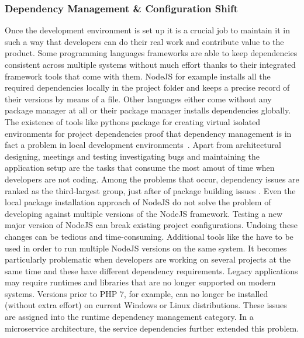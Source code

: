 \documentclass[12pt, a4paper]{article}
\begin{document}
        \subsubsection{Dependency Management \& Configuration Shift}\label{sssec::dependency}
        Once the development environment is set up it is a crucial job to maintain it in such a way that developers can do their real work and contribute value to the product. Some programming languages frameworks are able to keep dependencies consistent across multiple systems without much effort thanks to their integrated framework tools that come with them. NodeJS for example installs all the required dependencies locally in the project folder and keeps a precise record of their versions by means of a  file. Other languages either come without any package manager at all or their package manager installs dependencies globally. The existence of tools like pythons  package for creating virtual isolated environments for project dependencies proof that dependency management is in fact a problem in local development environments~\cite{pythonvenv}. Apart from architectural designing, meetings and testing investigating bugs and maintaining the application setup are the tasks that consume the most amout of time when developers are not coding. Among the problems that occur, dependency issues are ranked as the third-largest group, just after of package building issues \cite{setuppain}.\newline
        Even the local package installation approach of NodeJS do not solve the problem of developing against multiple versions of the NodeJS framework. Testing a new major version of NodeJS can break existing project configurations. Undoing these changes can be tedious and time-consuming. Additional tools like the  have to be used in order to run multiple NodeJS versions on the same system. It becomes particularly problematic when developers are working on several projects at the same time and these have different dependency requirements. Legacy applications may require runtimes and libraries that are no longer supported on modern systems. Versions prior to PHP 7, for example, can no longer be installed (without extra effort) on current Windows or Linux distributions. These issues are assigned into the runtime dependency management category. In a microservice architecture, the service dependencies further extended this problem. \newline
\end{document}

